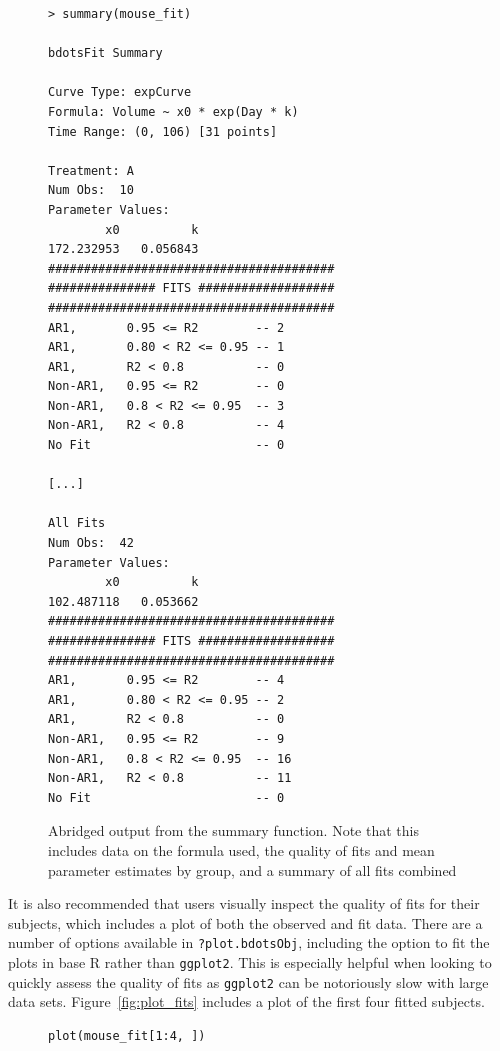 \documentclass{article}
\newcommand{\xt}{\texttt}%
\begin{document}
\begin{singlespace}
\begin{figure}[H]
\centering
\begin{BVerbatim}
> summary(mouse_fit)

bdotsFit Summary

Curve Type: expCurve 
Formula: Volume ~ x0 * exp(Day * k) 
Time Range: (0, 106) [31 points]

Treatment: A 
Num Obs:  10 
Parameter Values: 
        x0          k 
172.232953   0.056843 
########################################
############### FITS ###################
########################################
AR1,       0.95 <= R2        -- 2 
AR1,       0.80 < R2 <= 0.95 -- 1 
AR1,       R2 < 0.8          -- 0 
Non-AR1,   0.95 <= R2        -- 0 
Non-AR1,   0.8 < R2 <= 0.95  -- 3 
Non-AR1,   R2 < 0.8          -- 4 
No Fit                       -- 0 

[...]

All Fits 
Num Obs:  42 
Parameter Values: 
        x0          k 
102.487118   0.053662 
########################################
############### FITS ###################
########################################
AR1,       0.95 <= R2        -- 4 
AR1,       0.80 < R2 <= 0.95 -- 2 
AR1,       R2 < 0.8          -- 0 
Non-AR1,   0.95 <= R2        -- 9 
Non-AR1,   0.8 < R2 <= 0.95  -- 16 
Non-AR1,   R2 < 0.8          -- 11 
No Fit                       -- 0 
\end{BVerbatim}
\caption{Abridged output from the summary function. Note that this includes data on the formula used, the quality of fits and mean parameter estimates by group, and a summary of all fits combined}
\end{figure}
\end{singlespace}

It is also recommended that users visually inspect the quality of fits for their subjects, which includes a plot of both the observed and fit data. There are a number of options available in \xt{?plot.bdotsObj}, including the option to fit the plots in base R rather than \xt{ggplot2}. This is especially helpful when looking to quickly assess the quality of fits as \xt{ggplot2} can be notoriously slow with large data sets. Figure~\ref{fig:plot_fits} includes a plot of the first four fitted subjects.


\begin{singlespace}
\begin{figure}[H]
\centering
\begin{BVerbatim}
plot(mouse_fit[1:4, ])
\end{BVerbatim}
\end{figure}
\end{singlespace}
\end{document}
